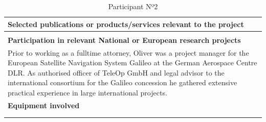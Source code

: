 \begin{longtable}[H]{|p{0.7cm}|p{4cm}|p{7cm}|p{1.3cm}|}
	\multicolumn{4}{|p{13cm}|}{\textbf{Selected publications or products/services relevant to the project}}  \\ \hline
	
	\multicolumn{4}{|p{13cm}|}{}  \\ \hline
	
	\multicolumn{4}{|p{13cm}|}{\textbf{Participation in relevant National or European research projects}}  \\ \hline
	
	\multicolumn{4}{|p{13cm}|}{Prior to working as a fulltime attorney, Oliver was a project manager for the European Satellite Navigation System Galileo at the German Aerospace Centre DLR. As authorised officer of TeleOp GmbH and legal advisor to the international consortium for the Galileo concession he gathered extensive practical experience in large international projects. }  \\ \hline
	
	\multicolumn{4}{|p{13cm}|}{\textbf{Equipment involved}}  \\ \hline
	
	\multicolumn{4}{|p{13cm}|}{}  \\ \hline
	\caption{Participant Nº2}
\end{longtable}

